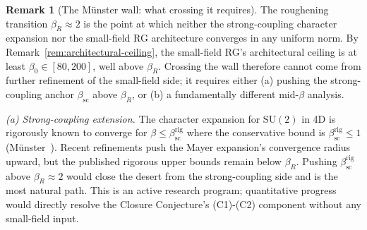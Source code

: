\documentclass[11pt]{article}
\theoremstyle{definition}
\newtheorem{remark}[theorem]{Remark}
\newcommand{\SU}{\mathrm{SU}}
\begin{document}
\begin{remark}[The M\"unster wall: what crossing it requires]
\label{rem:munster-wall}
The roughening transition $\beta_R\approx 2$ \cite{Munster81} is the
point at which neither the strong-coupling character expansion nor
the small-field RG architecture converges in any uniform norm.  By
Remark~\ref{rem:architectural-ceiling}, the small-field RG's
architectural ceiling is at least $\beta_0\in[80,200]$, well above
$\beta_R$.  Crossing the wall therefore cannot come from further
refinement of the small-field side; it requires either (a) pushing
the strong-coupling anchor $\beta_{\mathrm{sc}}$ above $\beta_R$, or
(b) a fundamentally different mid-$\beta$ analysis.

\emph{(a) Strong-coupling extension.}  The character expansion for
$\SU(2)$ in 4D is rigorously known to converge for
$\beta\le\beta_{\mathrm{sc}}^{\mathrm{rig}}$ where the conservative
bound is $\beta_{\mathrm{sc}}^{\mathrm{rig}}\le 1$
\textup{(}M\"unster~\cite{Munster81}\textup{)}.  Recent refinements
\cite{SZZ22,CNS25} push the Mayer expansion's convergence radius
upward, but the published rigorous upper bounds remain below
$\beta_R$.  Pushing $\beta_{\mathrm{sc}}^{\mathrm{rig}}$ above
$\beta_R\approx 2$ would close the desert from the strong-coupling
side and is the most natural path.  This is an active research
program; quantitative progress would directly resolve the
Closure Conjecture's (C1)-(C2) component without any small-field
input.


\end{remark}
\end{document}
